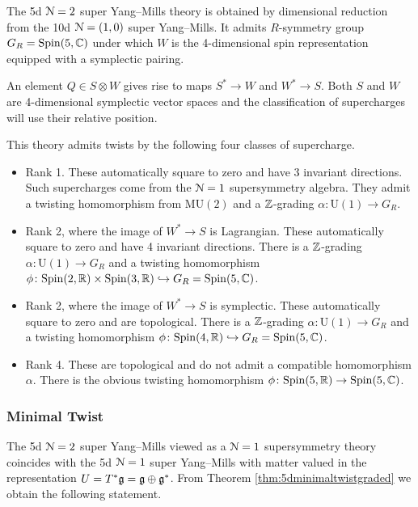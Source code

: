 \documentclass[10pt, oneside]{article}
\newcommand{\MU}{\mathrm{MU}}
\renewcommand{\U}{\mathrm{U}}
\begin{document}
The 5d $\mathcal N=2$ super Yang--Mills theory is obtained by dimensional reduction from the 10d $\mathcal N=(1, 0)$ super Yang--Mills. It admits $R$-symmetry group $G_R=\mathrm{Spin}(5, \mathbb C)$ under which $W$ is the 4-dimensional spin representation equipped with a symplectic pairing.

An element $Q\in S\otimes W$ gives rise to maps $S^*\rightarrow W$ and $W^*\rightarrow S$. Both $S$ and $W$ are 4-dimensional symplectic vector spaces and the classification of supercharges will use their relative position.

This theory admits twists by the following four classes of supercharge.
\begin{itemize}
\item Rank 1. These automatically square to zero and have 3 invariant directions. Such supercharges come from the $\mathcal N=1$ supersymmetry algebra. They admit a twisting homomorphism from $\MU(2)$ and a $\mathbb Z$-grading $\alpha\colon \U(1)\rightarrow G_R$.

\item Rank 2, where the image of $W^*\rightarrow S$ is Lagrangian. These automatically square to zero and have 4 invariant directions. There is a $\mathbb Z$-grading $\alpha\colon \U(1)\rightarrow G_R$ and a twisting homomorphism $\phi\colon \mathrm{Spin}(2, \mathbb R)\times \mathrm{Spin}(3, \mathbb R)\hookrightarrow G_R=\mathrm{Spin}(5, \mathbb C)$.

\item Rank 2, where the image of $W^*\rightarrow S$ is symplectic. These automatically square to zero and are topological. There is a $\mathbb Z$-grading $\alpha\colon \U(1)\rightarrow G_R$ and a twisting homomorphism $\phi\colon \mathrm{Spin}(4, \mathbb R)\hookrightarrow G_R=\mathrm{Spin}(5, \mathbb C)$.

\item Rank 4. These are topological and do not admit a compatible homomorphism $\alpha$. There is the obvious twisting homomorphism $\phi\colon \mathrm{Spin}(5, \mathbb R)\rightarrow \mathrm{Spin}(5, \mathbb C)$.
\end{itemize}

\subsubsection{Minimal Twist}
\label{sect:5dminimaltwist}

The 5d $\mathcal N=2$ super Yang--Mills viewed as a $\mathcal N=1$ supersymmetry theory coincides with the 5d $\mathcal N=1$ super Yang--Mills with matter valued in the representation $U=T^*\mathfrak g=\mathfrak g\oplus \mathfrak g^*$. From Theorem \ref{thm:5dminimaltwistgraded} we obtain the following statement.
\end{document}
